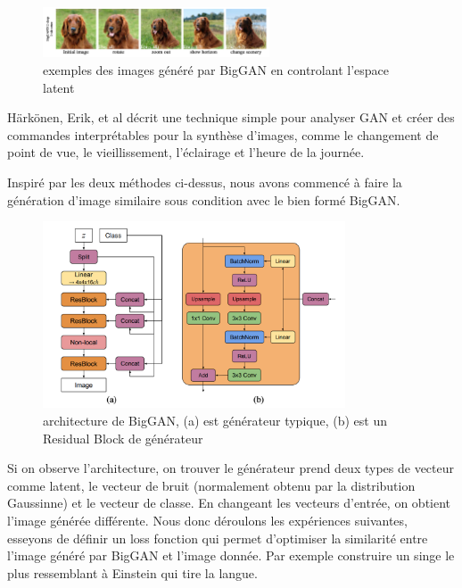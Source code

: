 \begin{figure}[H] 
	\centering 
	\includegraphics[width=0.6\textwidth]{./resources/img/GANspace.jpg} %
	\caption{exemples des images généré par BigGAN en controlant l'espace latent\cite{harkonen2020ganspace}} %
	\label{Fig3_3} %
\end{figure}
Härkönen, Erik, et al\cite{harkonen2020ganspace} décrit une technique simple pour analyser GAN et créer des commandes interprétables pour la synthèse d'images, comme le changement de point de vue, le vieillissement, l'éclairage et l'heure de la journée.

Inspiré par les deux méthodes ci-dessus, nous avons commencé à faire la génération d'image similaire sous condition avec le bien formé BigGAN. 

\begin{figure}[H] 
	\centering 
	\includegraphics[width=0.8\textwidth]{./resources/img/BigGAN.png} %
	\caption{architecture de BigGAN, (a) est générateur typique, (b) est un  Residual Block de générateur} %
	\label{Fig3_4} %
\end{figure}

Si on observe l'architecture, on trouver le générateur prend deux types de vecteur comme latent, le vecteur de bruit (normalement obtenu par la distribution Gaussinne) et le vecteur de classe. En changeant les vecteurs d'entrée, on obtient l'image générée différente. Nous donc déroulons les expériences suivantes, esseyons de définir un loss fonction qui permet d'optimiser la similarité entre l'image généré par BigGAN et l'image donnée. Par exemple construire un singe le plus ressemblant à Einstein qui tire la langue.



